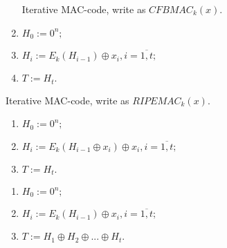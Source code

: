 \begin{definition}
    \begin{enumerate}
        Iterative MAC-code, write as $CFBMAC_k(x)$.
        \item $H_0 := 0^n;$
        \item $H_i := E_k(H_{i-1}) \oplus x_i, i = \overline{1, t};$
        \item $T := H_t.$
    \end{enumerate}
\end{definition}

\begin{definition}
    Iterative MAC-code, write as $RIPEMAC_k(x)$.
    \begin{enumerate}
        \item $H_0 := 0^n;$
        \item $H_i := E_k(H_{i-1} \oplus x_i) \oplus x_i, i = \overline{1, t};$
        \item $T := H_t.$
    \end{enumerate}
\end{definition}

\begin{definition}
    \begin{enumerate}
        Iterative MAC-code, write as $CFBMAC_k(x)$.
        \item $H_0 := 0^n;$
        \item $H_i := E_k(H_{i-1}) \oplus x_i, i = \overline{1, t};$
        \item $T := H_1 \oplus H_2 \oplus ... \oplus H_t.$
    \end{enumerate}
\end{definition}


